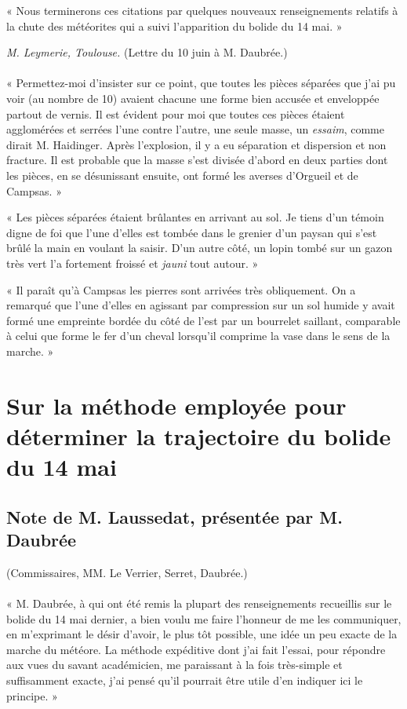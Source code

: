 \documentclass[a4paper, 11pt, oneside, polutonikogreek, french]{article}
\begin{document}
« Nous terminerons ces citations par quelques nouveaux renseignements relatifs à la chute des météorites qui a suivi l'apparition du bolide du 14 mai. »
\begin{center}
\emph{M. Leymerie, Toulouse.} (Lettre du 10 juin à M. Daubrée.)
\end{center}
\paragraph{}
« Permettez-moi d'insister sur ce point, que toutes les pièces séparées que j'ai pu voir (au nombre de 10) avaient chacune une forme bien accusée et enveloppée partout de vernis. Il est évident pour moi que toutes ces pièces étaient agglomérées et serrées l'une contre l'autre, une seule masse, un \emph{essaim}, comme dirait M. Haidinger. Après l'explosion, il y a eu séparation et dispersion et non fracture. Il est probable que la masse s'est divisée d'abord en deux parties dont les pièces, en se désunissant ensuite, ont formé les averses d'Orgueil et de Campsas. »

« Les pièces séparées étaient brûlantes en arrivant au sol. Je tiens d'un témoin digne de foi que l'une d'elles est tombée dans le grenier d'un paysan qui s'est brûlé la main en voulant la saisir. D'un autre côté, un lopin tombé sur un gazon très vert l'a fortement froissé et \emph{jauni} tout autour. »

« Il paraît qu'à Campsas les pierres sont arrivées très obliquement. On a remarqué que l'une d'elles en agissant par compression sur un sol humide y avait formé une empreinte bordée du côté de l'est par un bourrelet saillant, comparable à celui que forme le fer d'un cheval lorsqu'il comprime la vase dans le sens de la marche. »
\clearpage
\section{Sur la méthode employée pour déterminer la trajectoire du bolide du 14 mai}
\subsection*{Note de M. Laussedat, présentée par M. Daubrée}
\begin{center}
(Commissaires, MM. Le Verrier, Serret, Daubrée.) 
\end{center}
\paragraph{}
« M. Daubrée, à qui ont été remis la plupart des renseignements recueillis sur le bolide du 14 mai dernier, a bien voulu me faire l'honneur de me les communiquer, en m'exprimant le désir d'avoir, le plus tôt possible, une idée un peu exacte de la marche du météore. La méthode expéditive dont j'ai fait l'essai, pour répondre aux vues du savant académicien, me paraissant à la fois très-simple et suffisamment exacte, j'ai pensé qu'il pourrait être utile d'en indiquer ici le principe. »
\end{document}
